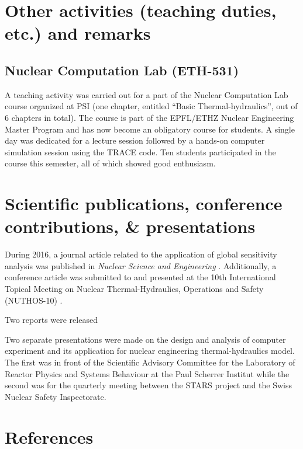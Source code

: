 \documentclass[11pt,titlepage]{article}
\begin{document}
\section{Other activities (teaching duties, etc.) and remarks}

\subsection{Nuclear Computation Lab (ETH-531)}

A teaching activity was carried out for a part of the Nuclear Computation Lab 
course organized at PSI (one chapter, entitled ``Basic Thermal-hydraulics'', out of 
6 chapters in total). 
The course is part of the EPFL/ETHZ Nuclear Engineering Master Program and has 
now become an obligatory course for students.
A single day was dedicated for a lecture session followed by a hands-on computer
simulation session using the TRACE code.
Ten students participated in the course this semester, all of which showed good 
enthusiasm.

\section{Scientific publications, conference contributions, \& presentations}

During 2016, a journal article related to the application of global sensitivity 
analysis was published in \textit{Nuclear Science and Engineering} \cite{Wicaksono2016a}. 
Additionally, a conference article was submitted to and presented at the 10th 
International Topical Meeting on Nuclear Thermal-Hydraulics, Operations and Safety
(NUTHOS-10) \cite{Wicaksono2016}.

Two reports were released 

Two separate presentations were made on the design and analysis of computer experiment 
and its application for nuclear engineering thermal-hydraulics model. 
The first was in front of the Scientific Advisory Committee for 
the Laboratory of Reactor Physics and Systems Behaviour at the Paul Scherrer Institut while
the second was for the quarterly meeting between the STARS project and the Swiss Nuclear Safety 
Inspectorate.

\nocite{Wicaksono2014a}
\nocite{Wicaksono2014b}
\nocite{Wicaksono2014c}
\nocite{Wicaksono2015a}
\nocite{Wicaksono2015b}
\nocite{Wicaksono2015c}

\section{References}
\end{document}
